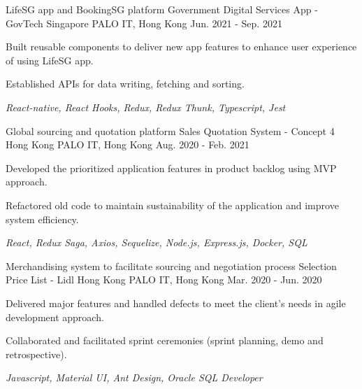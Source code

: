 

\begin{cventries}

  \cventry
    {LifeSG app and BookingSG platform} %
    {Government Digital Services App - GovTech Singapore} %
    {PALO IT, Hong Kong} %
    {Jun. 2021 - Sep. 2021} %
    {
      \begin{cvitems} %
        \item {Built reusable components to deliver new app features to enhance user experience of using LifeSG app.}
        \item {Established APIs for data writing, fetching and sorting.}
        \item {\textit{React-native, React Hooks, Redux, Redux Thunk, Typescript, Jest}}
      \end{cvitems}
    }

  \cventry
    {Global sourcing and quotation platform} %
    {Sales Quotation System - Concept 4 Hong Kong} %
    {PALO IT, Hong Kong} %
    {Aug. 2020 - Feb. 2021} %
    {
      \begin{cvitems} %
        \item {Developed the prioritized application features in product backlog using MVP approach.}
        \item {Refactored old code to maintain sustainability of the application and improve system efficiency.}
        \item {\textit{React, Redux Saga, Axios, Sequelize, Node.js, Express.js, Docker, SQL}}
      \end{cvitems}
    }

  \cventry
    {Merchandising system to facilitate sourcing and negotiation process} %
    {Selection Price List - Lidl Hong Kong} %
    {PALO IT, Hong Kong} %
    {Mar. 2020 - Jun. 2020} %
    {
      \begin{cvitems} %
        \item {Delivered major features and handled defects to meet the client's needs in agile development approach.}
        \item {Collaborated and facilitated sprint ceremonies (sprint planning, demo and retrospective).}
        \item {\textit{Javascript, Material UI, Ant Design, Oracle SQL Developer}}
      \end{cvitems}
    }

\end{cventries}

